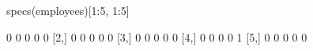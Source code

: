 \begin{Schunk}
% --begin: "lcut.specs"
\begin{Sinput}
 specs(employees)[1:5, 1:5]
\end{Sinput}
\begin{Soutput}
     [,1] [,2] [,3] [,4] [,5]
[1,]    0    0    0    0    0
[2,]    0    0    0    0    0
[3,]    0    0    0    0    0
[4,]    0    0    0    0    1
[5,]    0    0    0    0    0
\end{Soutput}
%
% --end: "lcut.specs"
\end{Schunk}
